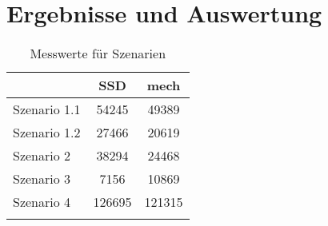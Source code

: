 \chapter{Ergebnisse und Auswertung}

\begin{longtable}{|l|c|c|} \hline
& SSD & mech \\ \hline
Szenario 1.1  & 54245 & 49389 \\ \hline
Szenario 1.2 & 27466 &  20619 \\ \hline
Szenario 2 & 38294 & 24468 \\ \hline
Szenario 3 & 7156 &  10869 \\ \hline
Szenario 4 & 126695 & 121315 \\ \hline
\caption{Messwerte für Szenarien}
\label{tbl:measure}
\end{longtable}

